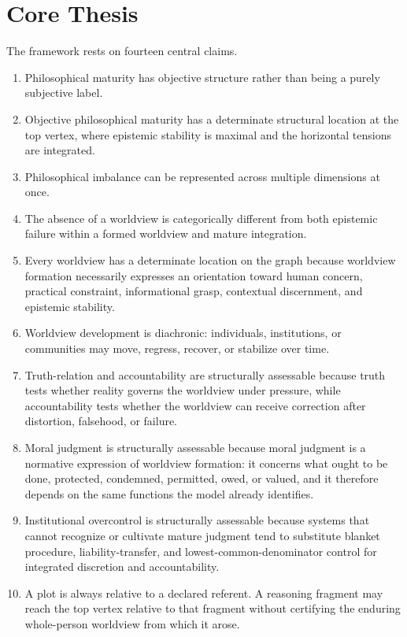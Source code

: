 \documentclass[11pt]{article}
\begin{document}
\section{Core Thesis}

The framework rests on fourteen central claims.

\begin{enumerate}[label=\arabic*.]
    \item Philosophical maturity has objective structure rather than being a purely subjective label.
    \item Objective philosophical maturity has a determinate structural location at the top vertex, where epistemic stability is maximal and the horizontal tensions are integrated.
    \item Philosophical imbalance can be represented across multiple dimensions at once.
    \item The absence of a worldview is categorically different from both epistemic failure within a formed worldview and mature integration.
    \item Every worldview has a determinate location on the graph because worldview formation necessarily expresses an orientation toward human concern, practical constraint, informational grasp, contextual discernment, and epistemic stability.
    \item Worldview development is diachronic: individuals, institutions, or communities may move, regress, recover, or stabilize over time.
    \item Truth-relation and accountability are structurally assessable because truth tests whether reality governs the worldview under pressure, while accountability tests whether the worldview can receive correction after distortion, falsehood, or failure.
    \item Moral judgment is structurally assessable because moral judgment is a normative expression of worldview formation: it concerns what ought to be done, protected, condemned, permitted, owed, or valued, and it therefore depends on the same functions the model already identifies.
    \item Institutional overcontrol is structurally assessable because systems that cannot recognize or cultivate mature judgment tend to substitute blanket procedure, liability-transfer, and lowest-common-denominator control for integrated discretion and accountability.
    \item A plot is always relative to a declared referent. A reasoning fragment may reach the top vertex relative to that fragment without certifying the enduring whole-person worldview from which it arose.

\end{enumerate}
\end{document}
